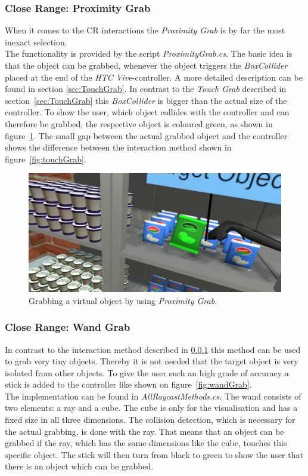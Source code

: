 \subsubsection{Close Range: Proximity Grab} \label{sec:ProximityGrab}
When it comes to the CR interactions the \textit{Proximity Grab} is by far the most inexact selection.  \\
The functionality is provided by the script \textit{ProximityGrab.cs}. The basic idea is that the object can be grabbed, whenever the object triggers the \textit{BoxCollider} \cite{website:BoxCollider} placed at the end of the \textit{HTC Vive}-controller. A more detailed description can be found in section \ref{sec:TouchGrab}. In contrast to the \textit{Touch Grab} described in section~\ref{sec:TouchGrab} this \textit{BoxCollider} is bigger than the actual size of the controller. To show the user, which object collides with the controller and can therefore be grabbed, the respective object is coloured green, as shown in figure~\ref{fig:proximityGrab}. The small gap between the actual grabbed object and the controller shows the difference between the interaction method shown in figure~\ref{fig:touchGrab}.

\begin{figure}[H] 
	\center 
	\includegraphics[width=12cm]{Images/ProximityGrab.PNG}			
	\caption[Grabbing a virtual object by using \textit{Proximity Grab}.]{Grabbing a virtual object by using \textit{Proximity Grab}.}
	\label{fig:proximityGrab}
\end{figure}


\subsubsection{Close Range: Wand Grab} \label{sec:WandGrab}
In contrast to the interaction method described in \ref{sec:ProximityGrab} this method can be used to grab very tiny objects. Thereby it is not needed that the target object is very isolated from other objects. To give the user such an high grade of accuracy a stick is added to the controller like shown on figure~\ref{fig:wandGrab}. \\
The implementation can be found in \textit{AllRaycastMethods.cs}. The wand consists of two elements: a ray \cite{website:Ray} and a cube. The cube is only for the visualisation and has a fixed size in all three dimensions. The collision detection, which is necessary for the actual grabbing, is done with the ray. That means that an object can be grabbed if the ray, which has the same dimensions like the cube, touches this specific object. The stick will then turn from black to green to show the user that there is an object which can be grabbed.

